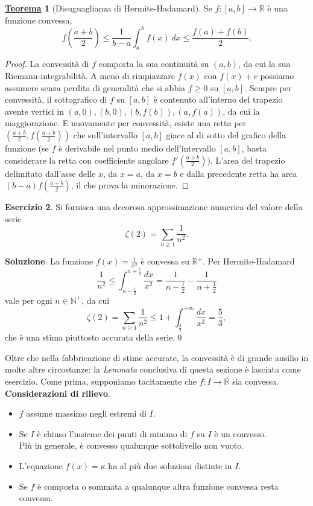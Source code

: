 \documentclass[a4paper,twoside]{article}
\newcommand{\R}{\mathbb{R}}
\theoremstyle{definition}
\newtheorem{theorem}{\color{Red}\underline{\textrm Teorema}}
\newtheorem{ex}[theorem]{Esercizio}
\numberwithin{theorem}{section}
\begin{document}
\begin{theorem}[Disuguaglianza di Hermite-Hadamard]\label{HermiteHadamard}
Se $f:[a,b]\to\mathbb{R}$ è una funzione convessa,
$$ f\left(\frac{a+b}{2}\right) \leq \frac{1}{b-a}\int_{a}^{b}f(x)\,dx \leq \frac{f(a)+f(b)}{2}.$$
\end{theorem}
\begin{proof} La convessità di $f$ comporta la sua continuità su $(a,b)$, da cui la sua Riemann-integrabilità. A meno di rimpiazzare $f(x)$ con $f(x)+c$ possiamo assumere senza perdita di generalità che si abbia $f\geq 0$ su $[a,b]$. Sempre per convessità, il sottografico di $f$ su $[a,b]$ è contenuto all'interno del trapezio avente vertici in $(a,0),(b,0),(b,f(b)),(a,f(a))$, da cui la maggiorazione.
E nuovamente per convessità, esiste una retta per $\left(\frac{a+b}{2},f\left(\frac{a+b}{2}\right)\right)$ che sull'intervallo $[a,b]$ giace al di sotto del grafico della funzione (se $f$ è derivabile nel punto medio dell'intervallo $[a,b]$, basta considerare la retta con coefficiente angolare $f'\left(\frac{a+b}{2}\right)$). L'area del trapezio delimitato dall'asse delle $x$, da $x=a$, da $x=b$ e dalla precedente retta ha area $(b-a)f\left(\frac{a+b}{2}\right)$, il che prova la minorazione.\end{proof}


\begin{ex} Si fornisca una decorosa approssimazione numerica del valore della serie $$\zeta(2)=\sum_{n\geq 1}\frac{1}{n^2}.$$
\end{ex}

\textbf{Soluzione}. La funzione $f(x)=\frac{1}{x^2}$ è convessa su $\mathbb{R}^+$. Per Hermite-Hadamard
$$ \frac{1}{n^2}\leq \int_{n-\frac{1}{2}}^{n+\frac{1}{2}}\frac{dx}{x^2}=\frac{1}{n-\frac{1}{2}}-\frac{1}{n+\frac{1}{2}} $$
vale per ogni $n\in\mathbb{N}^+$, da cui
$$\zeta(2)=\sum_{n\geq 1}\frac{1}{n^2}\leq 1+\int_{\frac{3}{2}}^{+\infty}\frac{dx}{x^2}=\frac{5}{3}, $$
che è una stima piuttosto accurata della serie.\qed



Oltre che nella fabbricazione di stime accurate, la convessità è di grande ausilio in molte altre circostanze: la \emph{Lemmata} conclusiva di questa sezione è lasciata come esercizio. Come prima, supponiamo tacitamente che $f:I\to\R$ sia convessa.\\



\textbf{Considerazioni di rilievo}. 
\begin{itemize}
 \item $f$ assume massimo negli estremi di $I$.
 \item Se $I$ è chiuso l'insieme dei punti di minimo di $f$ su $I$ è un convesso.\\ Più in generale, è convesso qualunque sottolivello non vuoto.
 \item L'equazione $f(x)=\kappa$ ha al più due soluzioni distinte in $I$.
 \item Se $f$ è composta o sommata a qualunque altra funzione convessa resta convessa.
\end{itemize}
\end{document}

